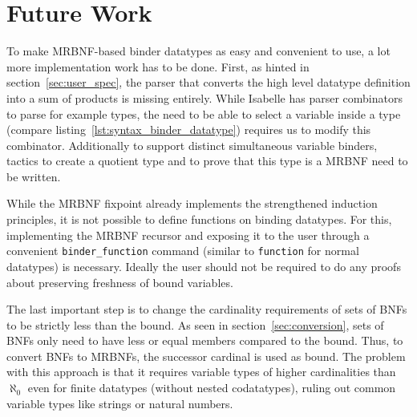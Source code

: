 \chapter{Future Work}

To make \ac{MRBNF}-based binder datatypes as easy and convenient to use, a lot more implementation work has to be done. First, as hinted in section~\ref{sec:user_spec}, the parser that converts the high level datatype definition into a sum of products is missing entirely. While Isabelle has parser combinators to parse for example types, the need to be able to select a variable inside a type (compare listing~\ref{lst:syntax_binder_datatype}) requires us to modify this combinator. Additionally to support distinct simultaneous variable binders, tactics to create a quotient type and to prove that this type is a \ac{MRBNF} need to be written.

While the \ac{MRBNF} fixpoint already implements the strengthened induction principles, it is not possible to define functions on binding datatypes. For this, implementing the \ac{MRBNF} recursor and exposing it to the user through a convenient \texttt{binder\_function} command (similar to \texttt{function} for normal datatypes) is necessary. Ideally the user should not be required to do any proofs about preserving freshness of bound variables.

The last important step is to change the cardinality requirements of sets of \acp{BNF} to be strictly less than the bound. As seen in section~\ref{sec:conversion}, sets of \acp{BNF} only need to have less or equal members compared to the bound. Thus, to convert \acp{BNF} to \acp{MRBNF}, the successor cardinal is used as bound. The problem with this approach is that it requires variable types of higher cardinalities than $\aleph_0$ even for finite datatypes (without nested codatatypes), ruling out common variable types like strings or natural numbers.
